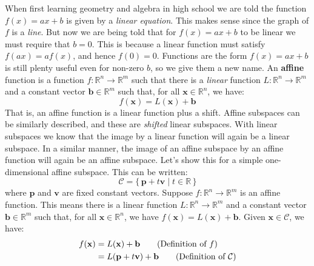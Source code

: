 \documentclass{article}
\theoremstyle{normal}
\newenvironment{example}{%
    \pushQED{\qed}\renewcommand{\qedsymbol}{$\blacksquare$}\examplex%
}{%
    \popQED\endexamplex%
}
\begin{document}
    \begin{example}[\textbf{Affine Transformations}]
        When first learning geometry and algebra in high school we are told
        the function $f(x)=ax+b$ is given by a \textit{linear equation}.
        This makes sense since the graph of $f$ is a \textit{line}. But now
        we are being told that for $f(x)=ax+b$ to be linear we must require
        that $b=0$. This is because a linear function must satisfy
        $f(ax)=af(x)$, and hence $f(0)=0$. Functions are the form
        $f(x)=ax+b$ is still plenty useful even for non-zero $b$, so we give
        them a new name. An \textbf{affine} function is a function
        $f:\mathbb{R}^{n}\rightarrow\mathbb{R}^{m}$ such that there is a
        \textit{linear} function $L:\mathbb{R}^{n}\rightarrow\mathbb{R}^{m}$
        and a constant vector $\mathbf{b}\in\mathbb{R}^{m}$ such that, for
        all $\mathbf{x}\in\mathbb{R}^{n}$, we have:
        \begin{equation}
            f(\mathbf{x})
            =L(\mathbf{x})+\mathbf{b}
        \end{equation}
        That is, an affine function is a linear function plus a shift. Affine
        subspaces can be similarly described, and these are \textit{shifted}
        linear subspaces. With linear subspaces we know that the image by a
        linear function will again be a linear subspace. In a similar manner,
        the image of an affine subspace by an affine function will again be
        an affine subspace. Let's show this for a simple one-dimensional
        affine subspace. This can be written:
        \begin{equation}
            \mathcal{C}=
            \{\,\mathbf{p}+t\mathbf{v}\;|\;t\in\mathbb{R}\,\}
        \end{equation}
        where $\mathbf{p}$ and $\mathbf{v}$ are fixed constant vectors.
        Suppose $f:\mathbb{R}^{n}\rightarrow\mathbb{R}^{m}$ is an affine
        function. This means there is a linear function
        $L:\mathbb{R}^{n}\rightarrow\mathbb{R}^{m}$ and a constant vector
        $\mathbf{b}\in\mathbb{R}^{m}$ such that, for all
        $\mathbf{x}\in\mathbb{R}^{n}$, we have
        $f(\mathbf{x})=L(\mathbf{x})+\mathbf{b}$. Given
        $\mathbf{x}\in\mathcal{C}$, we have:
        \begin{align}
            f(\mathbf{x})
            &=L(\mathbf{x})+\mathbf{b}
                \tag{Definition of $f$}\\
            &=L(\mathbf{p}+t\mathbf{v})+\mathbf{b}
                \tag{Definition of $\mathcal{C}$}\\

\end{align}
\end{example}
\end{document}
